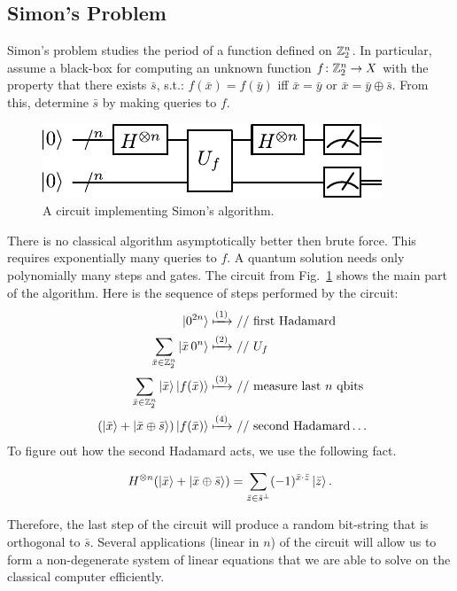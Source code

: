 \documentclass{article}
\begin{document}
\subsection{Simon's Problem}

Simon's problem studies the period of a function defined on $\mathbb Z^n_2$.
In particular,
assume a black-box for computing an unknown function $f\colon \mathbb Z^n_2 \to X$ with 
the property that there exists $\bar s$, s.t.: $f(\bar x) = f(\bar y)$ iff 
$\bar x = \bar y$ or $\bar x = \bar y \oplus \bar s$.
From this, determine $\bar s$ by making queries to $f$.

\begin{figure}
    \centering
    \includegraphics[width=0.8\linewidth]{pics/simon.pdf}
    \caption{A circuit implementing Simon's algorithm.}
    \label{fig:simon}
\end{figure}

There is no classical algorithm asymptotically better then brute force. This requires
exponentially many queries to $f$. A quantum solution needs only polynomially many 
steps and gates. The circuit from Fig.~\ref{fig:simon} shows the main part of the algorithm.
Here is the sequence of steps performed by the circuit:
\begin{align*}
      \ket {0^{2n}}
        \xmapsto{(1)} & \text{ // first Hadamard}\\
          \sum_{\bar x \in \mathbb Z^n_2} \ket {\bar x \,0^n}
        \xmapsto{(2)} &\text{ // $U_f$}\\\
          \sum_{\bar x \in \mathbb Z^n_2} 
            \ket {\bar x} \ket{f(\bar x)}
        \xmapsto{(3)} &\text{ // measure last $n$ qbits}\\\
          (\ket {\bar x} + \ket {\bar x \oplus \bar s}) \ket{f(\bar x)}
        \xmapsto{(4)} &\text{ // second Hadamard}\ldots
\end{align*}
To figure out how the second Hadamard acts, we use the following fact. 
\begin{exercise*}
  \[
    H^{\otimes n}(\ket{\bar x} + \ket{\bar x \oplus \bar s}  ) =
      \sum_{\bar z \in {\bar s}^\perp} (-1)^{\bar x \cdot \bar z} \ket{\bar z}.
  \]
\end{exercise*}

Therefore, the last step of the circuit will produce a random bit-string
that is orthogonal to $\bar s$. Several applications (linear in $n$)
 of the circuit will
allow us to form a non-degenerate system of linear equations that we are
able to solve on the classical computer efficiently.

\nocite{rieffel1998introduction} \nocite{arora09computationalcomplexity}
\nocite{kaye07}
\printbibliography
\end{document}
